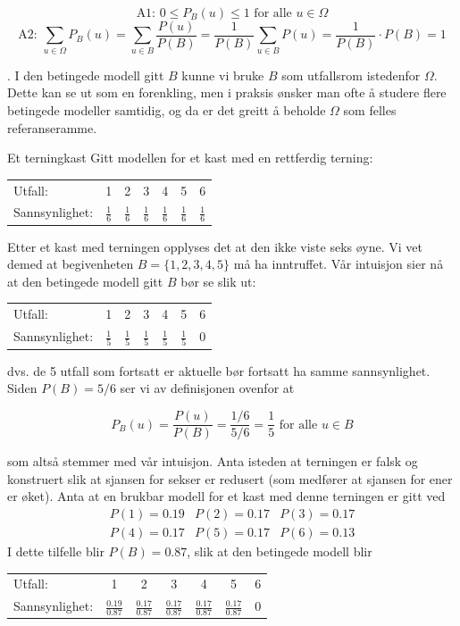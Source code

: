 \[ \mbox{A1: \ \ \ \ \ \ \ }  0 \leq P_B(u) \leq 1
                             \mbox{\ \ \  for alle \ \ } u\in \Omega\]
\[ \mbox{A2:\ \ }\sum_{u\in \Omega}P_B(u)=\sum_{u\in B}\frac{P(u)}{P(B)}= 
      \frac{1}{P(B)} \sum_{u\in B}P(u)=\frac{1}{P(B)} \cdot P(B)=1\]

. I den betingede modell gitt $B$ kunne vi bruke
$B$ som utfalls\-rom istedenfor $\Omega$. Dette kan se ut som en
forenkling, men i praksis ønsker man ofte å studere flere
betingede modeller samtidig, og da er det greitt å beholde
$\Omega$ som felles referanseramme. \\

\begin{eksempel}{Et terningkast}
Gitt modellen for et kast med en rettferdig terning:
\begin{center}
\begin{tabular}{lcccccc}
Utfall:          &    1 & 2 & 3 & 4 & 5 & 6 \\
Sannsynlighet:   & $\frac{1}{6}$& $\frac{1}{6}$& $\frac{1}{6}$&$\frac{1}{6}$&
                  $ \frac{1}{6}$& $\frac{1}{6}$
\end{tabular}
\end{center}
Etter et kast med terningen opplyses det at den ikke viste seks
øyne. Vi vet demed at begivenheten $B=\{1,2,3,4,5\}$ må ha
inntruffet. Vår intuisjon sier nå at den betingede modell gitt
$B$ bør se slik ut:
\begin{center}
\begin{tabular}{lcccccc}
Utfall:          &    1 & 2 & 3 & 4 & 5 & 6 \\
Sannsynlighet:   & $\frac{1}{5}$& $\frac{1}{5}$& $\frac{1}{5}$& $\frac{1}{5}$&
                 $ \frac{1}{5}$&$0$
\end{tabular}
\end{center}
dvs. de 5 utfall som fortsatt er aktuelle bør fortsatt ha samme
sannsynlighet. Siden $P(B)=5/6$ ser vi av definisjonen ovenfor at

\[    P_B(u)=\frac{P(u)}{P(B)}=\frac{1/6}{5/6}=\frac{1}{5}
                                    \mbox{\ \  for alle \ \  } u \in B \]

\noindent som altså stemmer med vår intuisjon. Anta isteden at
 terningen er falsk og konstruert slik at sjansen for sekser er redusert (som
medfører at sjansen for ener er øket). Anta at en brukbar modell
for et kast med denne terningen er gitt ved
\begin{eqnarray*}
 P(1)=0.19&P(2)=0.17&P(3)=0.17 \\
 P(4)=0.17&P(5)=0.17&P(6)=0.13
\end{eqnarray*}
I dette tilfelle blir $P(B)=0.87$, slik at den betingede modell blir 

\begin{tabular}{lcccccc}
Utfall:          &    1 & 2 & 3 & 4 & 5 & 6 \\
Sannsynlighet:   &$\frac{0.19}{0.87}$&$\frac{0.17}{0.87}$&$\frac{0.17}{0.87}$&
                 $\frac{0.17}{0.87}$&$\frac{0.17}{0.87}$&$0$
\end{tabular}
\end{eksempel}
